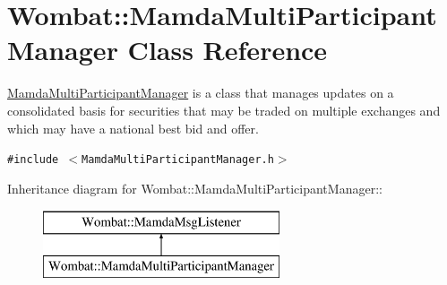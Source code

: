 \hypertarget{classWombat_1_1MamdaMultiParticipantManager}{
\section{Wombat::Mamda\-Multi\-Participant\-Manager Class Reference}
\label{classWombat_1_1MamdaMultiParticipantManager}
}
\hyperlink{classWombat_1_1MamdaMultiParticipantManager}{Mamda\-Multi\-Participant\-Manager} is a class that manages updates on a consolidated basis for securities that may be traded on multiple exchanges and which may have a national best bid and offer.  


{\tt \#include $<$Mamda\-Multi\-Participant\-Manager.h$>$}

Inheritance diagram for Wombat::Mamda\-Multi\-Participant\-Manager::\begin{figure}[H]
\begin{center}
\leavevmode
\includegraphics[height=2cm]{classWombat_1_1MamdaMultiParticipantManager}
\end{center}
\end{figure}
